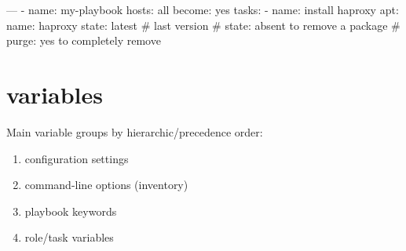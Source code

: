 \documentclass{refcard}
\begin{document}
\begin{yamlbox}[title={playbook using apt module (2)}]
  ---
  - name: my-playbook
    hosts: all
    become: yes
    tasks:
    - name: install haproxy
      apt:
        name: haproxy
        state: latest # last version
        # state: absent to remove a package
        # purge: yes to completely remove
\end{yamlbox}

\section{variables}

Main variable groups by hierarchic/precedence order:
\begin{enumerate}
    \item configuration settings\vspace{-0.75em}
    \item command-line options (inventory)\vspace{-0.75em}
    \item playbook keywords\vspace{-0.75em}
    \item role/task variables
\end{enumerate}

\rflicense
\end{document}
